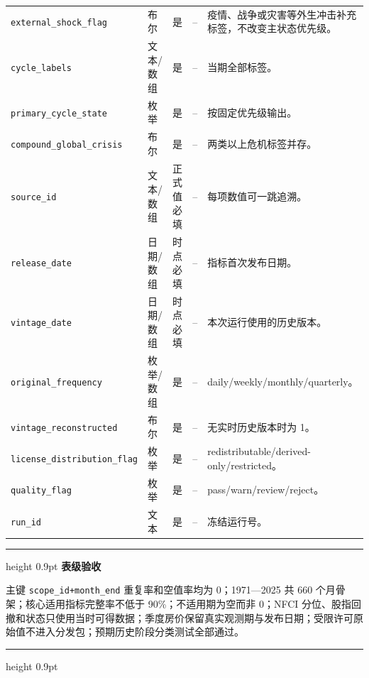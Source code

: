 \documentclass[UTF8,fontset=windows,12pt,openany]{ctexbook}
\newenvironment{gatebox}[1][]{%
  \par\medskip\noindent\begin{center}\begin{minipage}{0.93\textwidth}%
  \color{GoldLine}\hrule height 0.9pt\vspace{0.45em}%
  \textbf{#1}\par\smallskip\color{black}%
}{%
  \par\vspace{0.35em}\color{GoldLine}\hrule height 0.9pt%
  \end{minipage}\end{center}\medskip%
}
\newcommand{\Field}[1]{{\small\nolinkurl{#1}}}
\begin{document}
\begin{landscape}
\begin{longtable}{p{4.0cm}p{2.0cm}p{2.2cm}p{2.8cm}p{7.3cm}}
\Field{external_shock_flag} & 布尔 & 是 & -- & 疫情、战争或灾害等外生冲击补充标签，不改变主状态优先级。\\
\Field{cycle_labels} & 文本/数组 & 是 & -- & 当期全部标签。\\
\Field{primary_cycle_state} & 枚举 & 是 & -- & 按固定优先级输出。\\
\Field{compound_global_crisis} & 布尔 & 是 & -- & 两类以上危机标签并存。\\
\Field{source_id} & 文本/数组 & 正式值必填 & -- & 每项数值可一跳追溯。\\
\Field{release_date} & 日期/数组 & 时点必填 & -- & 指标首次发布日期。\\
\Field{vintage_date} & 日期/数组 & 时点必填 & -- & 本次运行使用的历史版本。\\
\Field{original_frequency} & 枚举/数组 & 是 & -- & daily/weekly/monthly/quarterly。\\
\Field{vintage_reconstructed} & 布尔 & 是 & -- & 无实时历史版本时为 1。\\
\Field{license_distribution_flag} & 枚举 & 是 & -- & redistributable/derived-only/restricted。\\
\Field{quality_flag} & 枚举 & 是 & -- & pass/warn/review/reject。\\
\Field{run_id} & 文本 & 是 & -- & 冻结运行号。\\
\bottomrule
\end{longtable}
\end{landscape}

\begin{gatebox}[表级验收]
主键 \Field{scope_id+month_end} 重复率和空值率均为 0；1971—2025 共 660 个月骨架；核心适用指标完整率不低于 90\%；不适用期为空而非 0；NFCI 分位、股指回撤和状态只使用当时可得数据；季度房价保留真实观测期与发布日期；受限许可原始值不进入分发包；预期历史阶段分类测试全部通过。
\end{gatebox}
\end{document}
